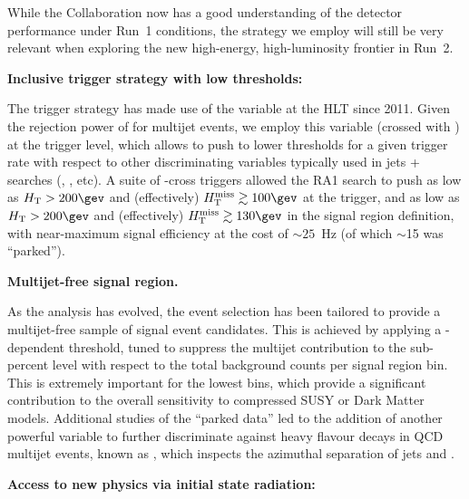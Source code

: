 
While the Collaboration now has a good understanding of the detector
performance under Run~1 conditions, the strategy we employ will still
be very relevant when exploring the new high-energy, high-luminosity
frontier in Run~2.

{\bf Inclusive trigger strategy with low thresholds:}

The trigger strategy has made use of the \alphat variable at the HLT
since 2011. Given the rejection power of \alphat for multijet events,
we employ this variable (crossed with \scalht) at the trigger level,
which allows to push to lower thresholds for a given trigger rate with
respect to other discriminating variables typically used in jets +
\met searches (\eg \met, \mht, etc). A suite of \scalht-\alphat cross
triggers allowed the RA1 search to push as low as $\scalht > 200\gev$
and (effectively) $\mht \gtrsim 100\gev$ at the trigger, and as low as
$\scalht > 200\gev$ and (effectively) $\mht \gtrsim 130\gev$ in the
signal region definition, with near-maximum signal efficiency at the
cost of $\sim25$~Hz (of which $\sim$15 was ``parked''). 

{\bf Multijet-free signal region.}

As the analysis has evolved, the event selection has been tailored to
provide a multijet-free sample of signal event candidates. This is
achieved by applying a \scalht-dependent \alphat threshold, tuned to
suppress the multijet contribution to the sub-percent level with
respect to the total background counts per signal region bin. This is
extremely important for the lowest \scalht bins, which provide a
significant contribution to the overall sensitivity to compressed SUSY
or Dark Matter models. Additional studies of the ``parked data'' led
to the addition of another powerful variable to further discriminate
against heavy flavour decays in QCD multijet events, known as \bdphi,
which inspects the azimuthal separation of jets and \met.

{\bf Access to new physics via initial state radiation:}

